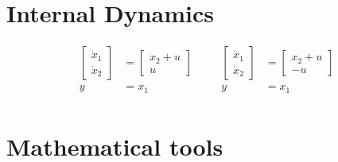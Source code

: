 \section{Internal Dynamics}
\ex{}
{
    \begin{equation}
        
        \begin{aligned}
           \begin{bmatrix}
               \dot{x}_1 \\
               \dot{x}_2 
           \end{bmatrix} 
        &= \begin{bmatrix}
            x_2+u  \\
            u

        \end{bmatrix}
        &\quad&
           \begin{bmatrix}
               \dot{x}_1 \\
               \dot{x}_2 
           \end{bmatrix} 
        &=
        \begin{bmatrix}
            x_2+u  \\
           -u
       \end{bmatrix}\\[1.25ex]
        y &= x_1 &\quad& y &=x_1\\[1.25ex]
        
        \end{aligned}
    \end{equation}
}


\section{Mathematical tools}



